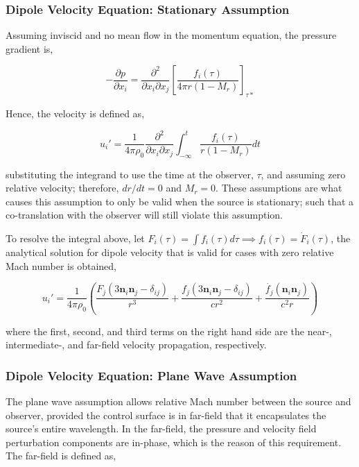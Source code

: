 \subsubsection{Dipole Velocity Equation: Stationary Assumption} \label{subsubsec:dipole_u1}

Assuming inviscid and no mean flow in the momentum equation, the pressure gradient is,

\begin{equation*}
    -\frac{\partial p}{\partial x_i} = 
    \frac{\partial^2}{\partial x_i \partial x_j} \left[ 
    \frac{f_i(\tau)}{4\pi r (1-M_r)}
    \right]_{\tau*}
\end{equation*}

Hence, the velocity is defined as,

\begin{equation*}
    u_i' = \frac{1}{4\pi\rho_0} \frac{\partial^2}{\partial x_i \partial x_j} \int_{-\infty}^t \frac{f_i(\tau)}{r(1-M_r)}dt
\end{equation*}

substituting the integrand to use the time at the observer, $\tau$, and assuming zero relative velocity; therefore, $dr/dt=0$ and $M_r=0$. These assumptions are what causes this assumption to only be valid when the source is stationary; such that a co-translation with the observer will still violate this assumption. 

To resolve the integral above, let $F_i(\tau) = \int f_i(\tau) d\tau \implies f_i(\tau) = \dot{F}_i(\tau)$, the analytical solution for dipole velocity that is valid for cases with zero relative Mach number is obtained,

\begin{equation}
    u_i'=\frac{1}{4\pi\rho_0} \left( 
    \frac{F_j(3\textbf{n}_i \textbf{n}_j-\delta_{ij})}{r^3} +
    \frac{f_j(3\textbf{n}_i \textbf{n}_j - \delta_{ij})}{cr^2} +
    \frac{\dot{f_j}(\textbf{n}_i \textbf{n}_j)}{c^2r}
    \right)
    \label{eq:dipole_u1}
\end{equation}

where the first, second, and third terms on the right hand side are the near-, intermediate-, and far-field velocity propagation, respectively. 

\subsubsection{Dipole Velocity Equation: Plane Wave Assumption} \label{subsubsec:dipole_u2}

The plane wave assumption allows relative Mach number between the source and observer, provided the control surface is in far-field that it encapsulates the source's entire wavelength. In the far-field, the pressure and velocity field perturbation components are in-phase, which is the reason of this requirement. The far-field is defined as,

